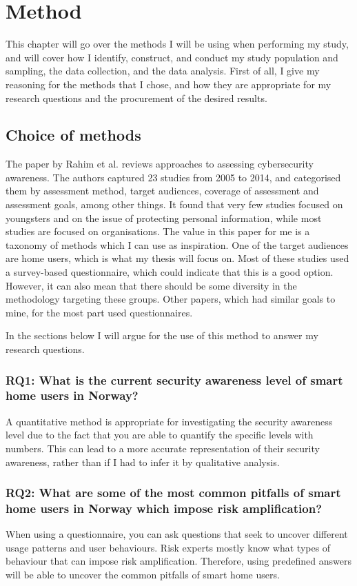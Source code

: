 \chapter{Method}
\label{chap:method}
This chapter will go over the methods I will be using when performing my study, and will cover how I identify, construct, and conduct my study population and sampling, the data collection, and the data analysis. First of all, I give my reasoning for the methods that I chose, and how they are appropriate for my research questions and the procurement of the desired results. 

\section{Choice of methods}
The paper by Rahim et al. \cite{rahim_et_al} reviews approaches to assessing cybersecurity awareness. The authors captured 23 studies from 2005 to 2014, and categorised them by assessment method, target audiences, coverage of assessment and assessment goals, among other things. It found that very few studies focused on youngsters and on the issue of protecting personal information, while most studies are focused on organisations. The value in this paper for me is a taxonomy of methods which I can use as inspiration. One of the target audiences are home users, which is what my thesis will focus on. Most of these studies used a survey-based questionnaire, which could indicate that this is a good option. However, it can also mean that there should be some diversity in the methodology targeting these groups. Other papers, which had similar goals to mine, for the most part used questionnaires. 

In the sections below I will argue for the use of this method to answer my research questions. 

\subsection*{RQ1: What is the current security awareness level of smart home users in Norway?}
A quantitative method is appropriate for investigating the security awareness level due to the fact that you are able to quantify the specific levels with numbers. This can lead to a more accurate representation of their security awareness, rather than if I had to infer it by qualitative analysis. 

\subsection*{RQ2: What are some of the most common pitfalls of smart home users in Norway which impose risk amplification?}
When using a questionnaire, you can ask questions that seek to uncover different usage patterns and user behaviours. Risk experts mostly know what types of behaviour that can impose risk amplification. Therefore, using predefined answers will be able to uncover the common pitfalls of smart home users. 

